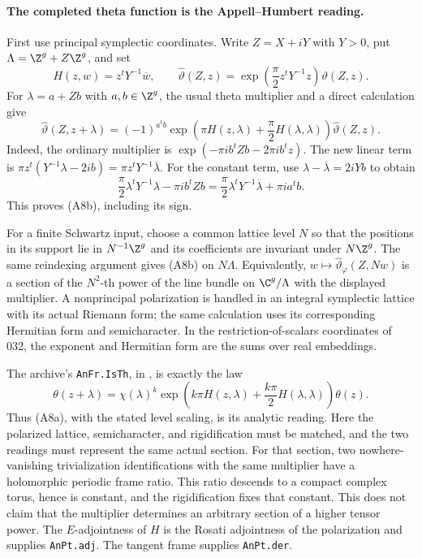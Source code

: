 \documentclass[11pt]{article}
\theoremstyle{definition}\newtheorem{definition}[theorem]{Definition}\newtheorem{remark}[theorem]{Remark}
\begin{document}
\paragraph{The completed theta function is the Appell--Humbert reading.}
First use principal symplectic coordinates.  Write $Z=X+iY$ with
$Y>0$, put $\Lambda=\Z^g+Z\Z^g$, and set
\[
 H(z,w)=z^tY^{-1}\overline w,\qquad
 \widehat\vartheta(Z,z)
       =\exp\left(\frac\pi2z^tY^{-1}z\right)\vartheta(Z,z).
 \tag{A8a}
\]
For $\lambda=a+Zb$ with $a,b\in\Z^g$, the usual theta multiplier
and a direct calculation give
\[
 \widehat\vartheta(Z,z+\lambda)
  =(-1)^{a^tb}
    \exp\left(\pi H(z,\lambda)+\frac\pi2H(\lambda,\lambda)\right)
       \widehat\vartheta(Z,z).
 \tag{A8b}
\]
Indeed, the ordinary multiplier is
$\exp(-\pi i b^tZb-2\pi i b^tz)$.  The new linear term is
$\pi z^t(Y^{-1}\lambda-2ib)=\pi z^tY^{-1}\overline\lambda$.
For the constant term, use
$\lambda-\overline\lambda=2iYb$ to obtain
\[
 \frac\pi2\lambda^tY^{-1}\lambda-\pi i b^tZb
  =\frac\pi2\lambda^tY^{-1}\overline\lambda+\pi i a^tb.
\]
This proves (A8b), including its sign.

For a finite Schwartz input, choose a common lattice level $N$ so
that the positions in its support lie in $N^{-1}\Z^g$ and its
coefficients are invariant under $N\Z^g$.  The same reindexing
argument gives (A8b) on $N\Lambda$.  Equivalently,
$w\mapsto\widehat\vartheta_\varphi(Z,Nw)$ is a section of the
$N^2$-th power of the line bundle on $\C^g/\Lambda$ with the
displayed multiplier.  A nonprincipal polarization is handled in
an integral symplectic lattice with its actual Riemann form; the
same calculation uses its corresponding Hermitian form and
semicharacter.  In the restriction-of-scalars coordinates of 032,
the exponent and Hermitian form are the sums over real embeddings.

The archive's \texttt{AnFr.IsTh}, in
, is exactly the law
\[
 \theta(z+\lambda)
   =\chi(\lambda)^k
       \exp\left(k\pi H(z,\lambda)
                +\frac{k\pi}{2}H(\lambda,\lambda)\right)\theta(z).
\]
Thus (A8a), with the stated level scaling, is its analytic reading.
Here the polarized lattice, semicharacter, and rigidification must
be matched, and the two readings must represent the same actual
section.  For that section, two nowhere-vanishing trivialization
identifications with the same multiplier have a holomorphic
periodic frame ratio.  This ratio descends to a compact complex
torus, hence is constant, and the rigidification fixes that
constant.  This does not claim that the multiplier determines an
arbitrary section of a higher tensor power.  The $E$-adjointness of
$H$ is the Rosati adjointness of
the polarization and supplies \texttt{AnPt.adj}.  The tangent
frame supplies \texttt{AnPt.der}.
\end{document}
